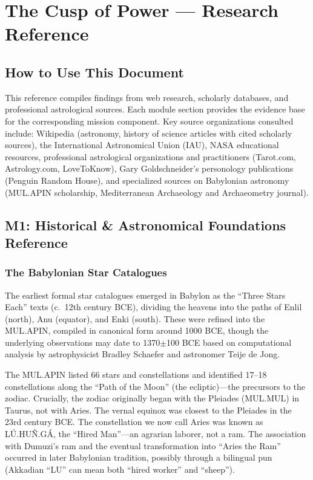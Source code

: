 \documentclass[11pt,letterpaper]{article}
\newcommand{\stageheader}[2]{%
  \noindent\colorbox{#2}{\makebox[\textwidth][l]{%
    \textcolor{white}{\bfseries\sffamily\hspace{6pt}#1\hspace{6pt}}}}%
  \vspace{0.5em}\par%
}
\begin{document}
\newpage

\stageheader{STAGE 2 --- RESEARCH REFERENCE}{secondary}

\section{The Cusp of Power --- Research Reference}

\subsection{How to Use This Document}

This reference compiles findings from web research, scholarly databases, and professional astrological sources. Each module section provides the evidence base for the corresponding mission component. Key source organizations consulted include: Wikipedia (astronomy, history of science articles with cited scholarly sources), the International Astronomical Union (IAU), NASA educational resources, professional astrological organizations and practitioners (Tarot.com, Astrology.com, LoveToKnow), Gary Goldschneider's personology publications (Penguin Random House), and specialized sources on Babylonian astronomy (MUL.APIN scholarship, Mediterranean Archaeology and Archaeometry journal).

\subsection{M1: Historical \& Astronomical Foundations Reference}

\subsubsection{The Babylonian Star Catalogues}

The earliest formal star catalogues emerged in Babylon as the ``Three Stars Each'' texts (c.\ 12th century BCE), dividing the heavens into the paths of Enlil (north), Anu (equator), and Enki (south). These were refined into the MUL.APIN, compiled in canonical form around 1000 BCE, though the underlying observations may date to 1370$\pm$100 BCE based on computational analysis by astrophysicist Bradley Schaefer and astronomer Teije de Jong.

The MUL.APIN listed 66 stars and constellations and identified 17--18 constellations along the ``Path of the Moon'' (the ecliptic)---the precursors to the zodiac. Crucially, the zodiac originally began with the Pleiades (MUL.MUL) in Taurus, not with Aries. The vernal equinox was closest to the Pleiades in the 23rd century BCE. The constellation we now call Aries was known as LÚ.HUÑ.GÁ, the ``Hired Man''---an agrarian laborer, not a ram. The association with Dumuzi's ram and the eventual transformation into ``Aries the Ram'' occurred in later Babylonian tradition, possibly through a bilingual pun (Akkadian ``LU'' can mean both ``hired worker'' and ``sheep'').
\end{document}
